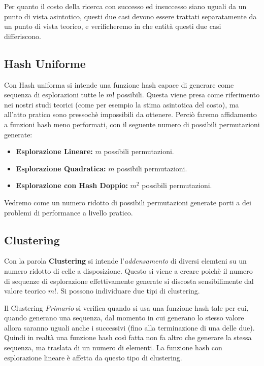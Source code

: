 \documentclass{article}
\begin{document}
Per quanto il costo della ricerca con successo ed insuccesso siano uguali da un punto di vista asintotico, questi due casi devono essere trattati separatamente da un punto di vista teorico, e verificheremo in che entità questi due casi differiscono.

\subsection{Hash Uniforme}
\label{Hash_Uniforme}
Con Hash uniforma si intende una funzione hash capace di generare come sequenza di esplorazioni tutte le $m!$ possibili. Questa viene presa come riferimento nei nostri studi teorici (come per esempio la stima asintotica del costo), ma all'atto pratico sono pressochè impossibili da ottenere. Perciò faremo affidamento a funzioni hash meno performati, con il seguente numero di possibili permutazioni generate:
\begin{itemize}
\item \textbf{Esplorazione Lineare:} $m$ possibili permutazioni.
\item \textbf{Esplorazione Quadratica:} $m$ possibili permutazioni.
\item \textbf{Esplorazione con Hash Doppio:} $m^2$ possibili permutazioni.
\end{itemize} 

Vedremo come un numero ridotto di possibili permutazioni generate porti a dei problemi di performance a livello pratico.

\subsection{Clustering}
Con la parola \textbf{Clustering} si intende l'\emph{addensamento} di diversi elemteni su un numero ridotto di celle a disposizione. Questo si viene a creare poichè il numero di sequenze di esplorazione effettivamente generate si discosta sensibilimente dal valore teorico $m!$. Si possono individuare due tipi di clustering.

Il Clustering \emph{Primario} si verifica quando si usa una funzione hash tale per cui, quando generano una sequenza, dal momento in cui generano lo stesso valore allora saranno uguali anche i successivi (fino alla terminazione di una delle due). Quindi in realtà una funzione hash così fatta non fa altro che generare la stessa sequenza, ma traslata di un numero di elementi. La funzione hash con esplorazione lineare è affetta da questo tipo di clustering.
\end{document}
